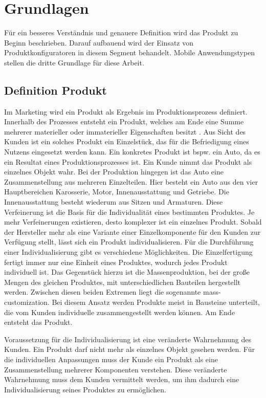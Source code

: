 \chapter{Grundlagen} \label{chapter_2}
Für ein besseres Verständnis und genauere Definition wird das Produkt zu Beginn beschrieben. Darauf aufbauend wird der Einsatz von Produktkonfiguratoren in diesem Segment behandelt. Mobile Anwendungstypen stellen die dritte Grundlage für diese Arbeit.

\section{Definition Produkt}
Im Marketing wird ein Produkt als Ergebnis im Produktionsprozess definiert. Innerhalb des Prozesses entsteht ein Produkt, welches am Ende eine Summe mehrerer materieller oder immaterieller Eigenschaften besitzt \cite{bib:product}. Aus Sicht des Kunden ist ein solches Produkt ein Einzelstück, das für die Befriedigung eines Nutzens eingesetzt werden kann. Ein konkretes Produkt ist bspw. ein Auto, da es ein Resultat eines Produktionsprozesses ist. Ein Kunde nimmt das Produkt als einzelnes Objekt wahr. Bei der Produktion hingegen ist das Auto eine Zusammenstellung aus mehreren Einzelteilen. Hier besteht ein Auto aus den vier Hauptbereichen Karosserie, Motor, Innenausstattung und Getriebe. Die Innenausstattung besteht wiederum aus Sitzen und Armaturen. Diese Verfeinerung ist die Basis für die Individualität eines bestimmten Produktes. Je mehr Verfeinerungen existieren, desto komplexer ist ein einzelnes Produkt. Sobald der Hersteller mehr als eine Variante einer Einzelkomponente für den Kunden zur Verfügung stellt, lässt sich ein Produkt individualisieren. Für die Durchführung einer Individualisierung gibt es verschiedene Möglichkeiten. Die Einzelfertigung fertigt immer nur eine Einheit eines Produktes, wodurch jedes Produkt individuell ist. Das Gegenstück hierzu ist die Massenproduktion, bei der große Mengen des gleichen Produktes, mit unterschiedlichen Bauteilen hergestellt werden. Zwischen diesen beiden Extremen liegt die sogenannte mass-customization. Bei diesem Ansatz werden Produkte meist in Bausteine unterteilt, die vom Kunden individuelle zusammengestellt werden können. Am Ende entsteht das Produkt.
 \par 

Voraussetzung für die Individualisierung ist eine veränderte Wahrnehmung des Kunden. Ein Produkt darf nicht mehr als einzelnes Objekt gesehen werden. Für die individuellen Anpassungen muss der Kunde ein Produkt als eine Zusammenstellung mehrerer Komponenten verstehen. Diese veränderte Wahrnehmung muss dem Kunden vermittelt werden, um ihm dadurch eine Individualisierung seines Produktes zu ermöglichen. \par

